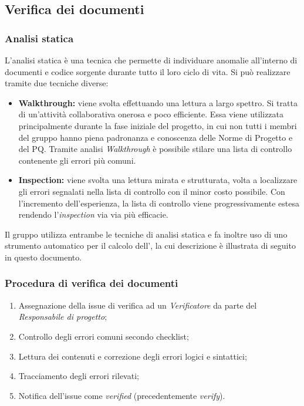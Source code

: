 \documentclass[../NormediProgetto.tex]{subfiles}
\begin{document}
\subsection{Verifica dei documenti}

\subsubsection{Analisi statica}

L’analisi statica è una tecnica che permette di individuare anomalie all’interno di documenti e codice sorgente durante tutto il loro ciclo di vita. Si può realizzare tramite due tecniche diverse:

\begin{itemize}
    \item \textbf{Walkthrough:} viene svolta effettuando una lettura a largo spettro. Si tratta di un’attività collaborativa onerosa e poco efficiente. Essa viene utilizzata principalmente durante la fase iniziale del progetto, in cui non tutti i membri del gruppo hanno piena padronanza e conoscenza delle Norme di Progetto e del PQ. Tramite analisi \textit{Walkthrough} è possibile stilare una lista di controllo contenente gli errori più comuni.
    
    \item \textbf{Inspection:} viene svolta una lettura mirata e strutturata, volta a localizzare gli errori segnalati nella lista di controllo con il minor costo possibile. Con l'incremento dell'esperienza, la lista di controllo viene progressivamente estesa rendendo l’\textit{inspection} via via più efficacie.
\end{itemize}

Il gruppo utilizza entrambe le tecniche di analisi statica e fa inoltre uso di uno strumento automatico per il calcolo dell', la cui descrizione è illustrata di seguito in questo documento.

\subsubsection{Procedura di verifica dei documenti}

\begin{enumerate}
    \item Assegnazione della issue di verifica ad un \textit{Verificatore} da parte del \textit{Responsabile di progetto};
    
    \item Controllo degli errori comuni secondo checklist;
    
    \item Lettura dei contenuti e correzione degli errori logici e sintattici;
    
    \item Tracciamento degli errori rilevati;
    
    \item Notifica dell'issue come \textit{verified} (precedentemente \textit{verify}).
\end{enumerate}
\end{document}
